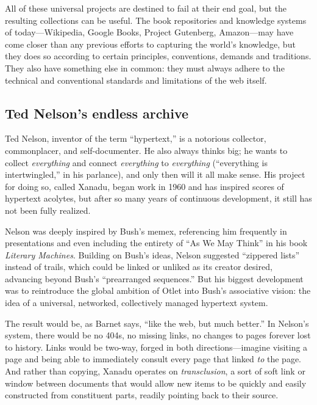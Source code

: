 All of these universal projects are destined to fail at their end goal, but the resulting collections can be useful. The book repositories and knowledge systems of today---Wikipedia, Google Books, Project Gutenberg, Amazon---may have come closer than any previous efforts to capturing the world's knowledge, but they does so according to certain principles, conventions, demands and traditions. They also have something else in common: they must always adhere to the technical and conventional standards and limitations of the web itself. 

\subsection{Ted Nelson's endless archive}

Ted Nelson, inventor of the term ``hypertext,'' is a notorious collector, commonplacer, and self-documenter. He also always thinks big; he wants to collect \emph{everything} and connect \emph{everything} to \emph{everything} (``everything is intertwingled,'' in his parlance), and only then will it all make sense. His project for doing so, called Xanadu, began work in 1960 and has inspired scores of hypertext acolytes, but after so many years of continuous development, it still has not been fully realized.

Nelson was deeply inspired by Bush's memex, referencing him frequently in presentations and even including the entirety of ``As We May Think'' in his book \emph{Literary Machines}. Building on Bush's ideas, Nelson suggested ``zippered lists'' instead of trails, which could be linked or unliked as its creator desired, advancing beyond Bush's ``prearranged sequences.''\autocite[313]{nelson_computer_1974} But his biggest development was to reintroduce the global ambition of Otlet into Bush's associative vision: the idea of a universal, networked, collectively managed hypertext system.

The result would be, as Barnet says, ``like the web, but much better.''\autocite[``The Magical Place of Literary Memory: Xanadu'']{barnet_memory_2013} In Nelson's system, there would be no 404s, no missing links, no changes to pages forever lost to history. Links would be two-way, forged in both directions---imagine visiting a page and being able to immediately consult every page that linked \emph{to} the page. And rather than copying, Xanadu operates on \emph{transclusion}, a sort of soft link or window between documents that would allow new items to be quickly and easily constructed from constituent parts, readily pointing back to their source.

